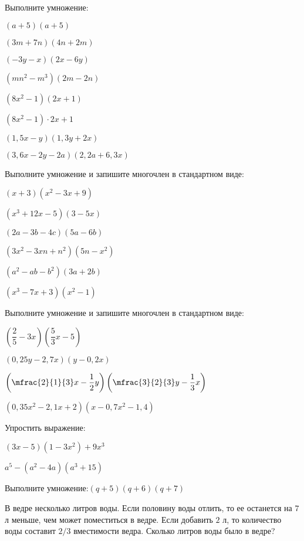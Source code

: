 %
%
\begin{class}[number=4]
	\begin{listofex}
		\item Выполните умножение:
		\begin{enumcols}[itemcolumns=2]
			\item \( (a+5)(a+5) \)
			\item \( (3m+7n)(4n+2m) \)
			\item \( (-3y-x)(2x-6y) \)
			\item \( (mn^2-m^3)(2m-2n) \)
			\item \( (8x^2-1)(2x+1) \)
			\item \( (8x^2-1)\cdot2x+1 \)
			\item \( (1,5x-y)(1,3y+2x) \)
			\item \( (3,6x-2y-2a)(2,2a+6,3x) \)
		\end{enumcols}
		\item Выполните умножение и запишите многочлен в стандартном виде:
		\begin{enumcols}[itemcolumns=3]
			\item \( (x+3)(x^2-3x+9) \)
			\item \( (x^3+12x-5)(3-5x) \)
			\item \( (2a-3b-4c)(5a-6b) \)
			\item \( (3x^2-3xn+n^2)(5n-x^2) \)
			\item \( (a^2-ab-b^2)(3a+2b) \)
			\item \( (x^3-7x+3)(x^2-1) \)
		\end{enumcols}
		\item Выполните умножение и запишите многочлен в стандартном виде:
		\begin{enumcols}[itemcolumns=2]
			\item \( \left( \dfrac{2}{5}-3x \right)\left( \dfrac{5}{3}x-5 \right) \)
			\item \( (0,25y-2,7x)(y-0,2x) \)
			\item \( \left( \mfrac{2}{1}{3}x-\dfrac{1}{2}y \right)\left( \mfrac{3}{2}{3}y-\dfrac{1}{3}x \right) \)
			\item \( (0,35x^2-2,1x+2)(x-0,7x^2-1,4) \)
		\end{enumcols}
		\item Упростить выражение:
		\begin{enumcols}[itemcolumns=2]
			\item \( (3x-5)(1-3x^2)+9x^3 \)
			\item \( a^5-(a^2-4a)(a^3+15) \)
		\end{enumcols}
		\item Выполните умножение:\quad\( (q+5)(q+6)(q+7) \)
		\item В ведре несколько литров воды. Если половину воды отлить, то ее останется на \( 7 \) л меньше, чем может поместиться в ведре. Если добавить \( 2 \) л, то количество воды составит \( 2/3 \) вместимости ведра. Сколько литров воды было в ведре?
	\end{listofex}
\end{class}
